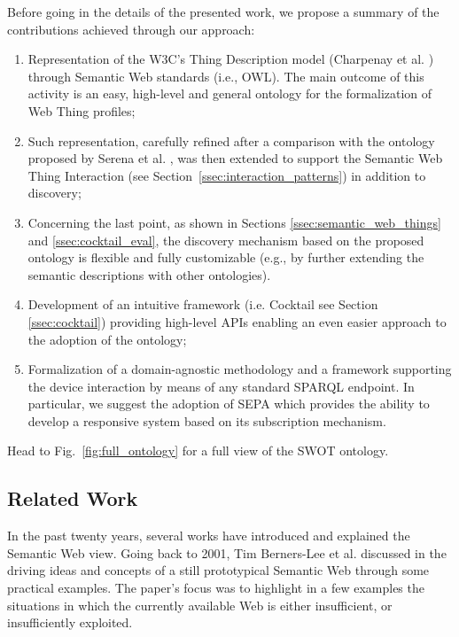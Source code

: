 Before going in the details of the presented work, we propose a summary of the contributions achieved through our approach:
\begin{enumerate}
    \item Representation of the W3C's Thing Description model (Charpenay et al. \cite{charpenay2016introducing}) through Semantic Web standards (i.e., OWL). The main outcome of this activity is an easy, high-level and general ontology for the formalization of Web Thing profiles;
    \item Such representation, carefully refined after a comparison with the ontology proposed by Serena et al. \cite{serena2018discovery}, was then extended to support the Semantic Web Thing Interaction (see Section~\ref{ssec:interaction_patterns}) in addition to discovery;
    \item Concerning the last point, as shown in Sections \ref{ssec:semantic_web_things} and \ref{ssec:cocktail_eval}, the discovery mechanism based on the proposed ontology is flexible and fully customizable (e.g., by further extending the semantic descriptions with other ontologies).
    \item Development of an intuitive framework (i.e. Cocktail see Section \ref{ssec:cocktail}) providing high-level APIs enabling an even easier approach to the adoption of the ontology;
    \item Formalization of a domain-agnostic methodology and a framework supporting the device interaction by means of any standard SPARQL endpoint. In particular, we suggest the adoption of SEPA which provides the ability to develop a responsive system based on its subscription mechanism.
\end{enumerate}

Head to Fig.~\ref{fig:full_ontology} for a full view of the SWOT ontology.

\subsection{Related Work}
In the past twenty years, several works have introduced and explained the Semantic Web view. Going back to 2001, Tim Berners-Lee et al. discussed in \cite{berners2001semantic} the driving ideas and concepts of a still prototypical Semantic Web through some practical examples. The paper's focus was to highlight in a few examples the situations in which the currently available Web is either insufficient, or insufficiently exploited. 

